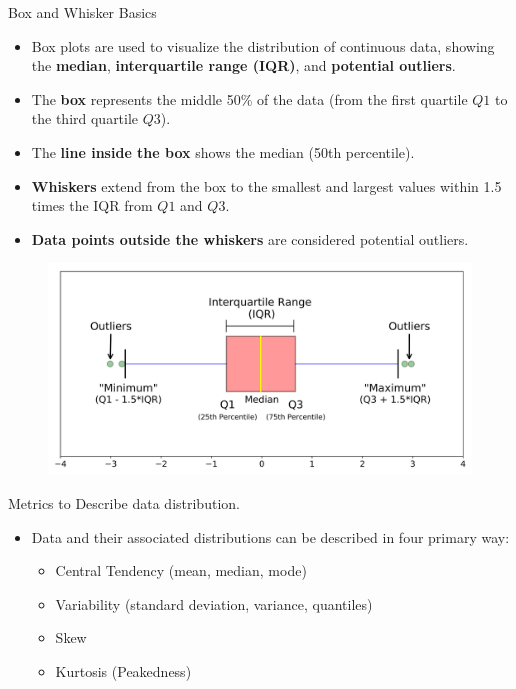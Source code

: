\documentclass[
  ignorenonframetext,
]{beamer}
\providecommand{\tightlist}{%
  \setlength{\itemsep}{0pt}\setlength{\parskip}{0pt}}
\begin{document}
\begin{frame}{Box and Whisker Basics}
\label{box-and-whisker-basics}
\begin{itemize}
\tightlist
\item
  Box plots are used to visualize the distribution of continuous data,
  showing the \textbf{median}, \textbf{interquartile range (IQR)}, and
  \textbf{potential outliers}.
\item
  The \textbf{box} represents the middle 50\% of the data (from the
  first quartile \(Q1\) to the third quartile \(Q3\)).
\item
  The \textbf{line inside the box} shows the median (50th percentile).
\item
  \textbf{Whiskers} extend from the box to the smallest and largest
  values within 1.5 times the IQR from \(Q1\) and \(Q3\).
\item
  \textbf{Data points outside the whiskers} are considered potential
  outliers.
\end{itemize}

\begin{figure}

{\centering \includegraphics[width=0.6\linewidth]{fig/box} 

}

\end{figure}
\end{frame}

\begin{frame}{Metrics to Describe data distribution.}
\label{metrics-to-describe-data-distribution.}
\begin{itemize}
\item
  Data and their associated distributions can be described in four
  primary way:

  \begin{itemize}
  \tightlist
  \item
    Central Tendency (mean, median, mode)
  \item
    Variability (standard deviation, variance, quantiles)
  \item
    Skew
  \item
    Kurtosis (Peakedness)
  \end{itemize}
\end{itemize}
\end{frame}
\end{document}
